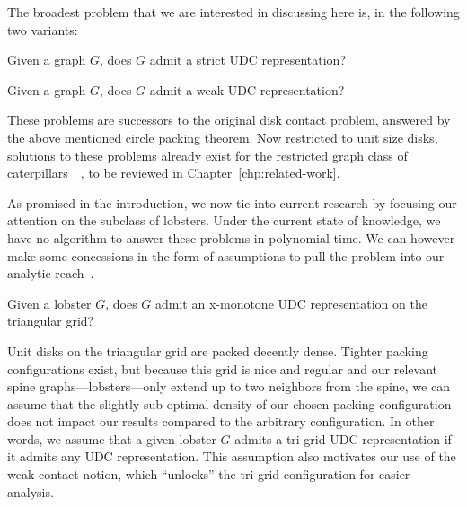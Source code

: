 The broadest problem that we are interested in discussing here is, in the following two variants:

\begin{problem}
Given a graph $G$, does $G$ admit a strict UDC representation?
\label{prob:strict-udc}
\end{problem}

\begin{problem}
Given a graph $G$, does $G$ admit a weak UDC representation?
\label{prob:weak-udc}
\end{problem}

These problems are successors to the original disk contact problem, answered by the above mentioned circle packing theorem. Now restricted to unit size disks, solutions to these problems already exist for the restricted graph class of caterpillars~\cite{Klemz2015}~\cite{Cleve2020}, to be reviewed in Chapter~\ref{chp:related-work}.

As promised in the introduction, we now tie into current research by focusing our attention on the subclass of lobsters. Under the current state of knowledge, we have no algorithm to answer these problems in polynomial time. We can however make some concessions in the form of assumptions to pull the problem into our analytic reach~\cite{Bhore2021}.

\begin{problem}
Given a lobster $G$, does $G$ admit an x-monotone UDC representation on the triangular grid?
\label{prob:weak-udc-lobster}
\end{problem}

Unit disks on the triangular grid are packed decently dense. Tighter packing configurations exist, but because this grid is nice and regular and our relevant spine graphs---lobsters---only extend up to two neighbors from the spine, we can assume that the slightly sub-optimal density of our chosen packing configuration does not impact our results compared to the arbitrary configuration. In other words, we assume that a given lobster $G$ admits a tri-grid UDC representation if it admits any UDC representation. This assumption also motivates our use of the weak contact notion, which ``unlocks'' the tri-grid configuration for easier analysis.

